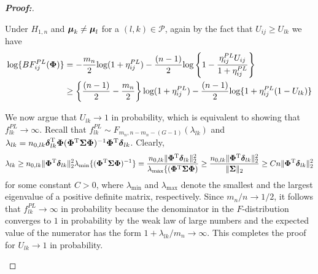 \documentclass[times,sort&compress,3p]{elsarticle}
\theoremstyle{plain}%
\theoremstyle{definition}
\def\log{\hbox{log}}
\def\log{\hbox{log}}
\def\be{\begin{eqnarray}}
\def\ee{\end{eqnarray}}
\def\trans{^{\rm T}}
\newcommand{\bSigma}{\mbox{\boldmath $\Sigma$}}
\newcommand{\udelta}            {\mbox{\boldmath$\delta$}}
\newcommand{\umu}               {\mbox{\boldmath$\mu$}}
\newcommand{\uPhi}              {\mbox{\boldmath$\Phi$}}
\begin{document}
\begin{proof}[\textbf{\upshape Proof:}]
\begin{description}
Under $H_{1,n}$ and $\umu_{k} \neq \umu_{l}$ for a $(l, k) \in \mathcal{P}$, again 
by the fact that $U_{ij}\geq U_{lk}$ 
we have
\begin{align*}
    \log\{BF^{PL}_{ij}(\uPhi) \} &= -\frac{m_n}{2}\log(1 + \eta^{PL}_{ij}) - \frac{(n-1)}{2}\log\left\{ 1 - \frac{\eta^{PL}_{ij} U_{ij}}{1 + \eta^{PL}_{ij}} \right\}\\
    & \geq \left\{\frac{(n - 1)}{2} - \frac{m_n}{2}\right\}\log(1 + \eta^{PL}_{ij}) - \frac{(n - 1)}{2}\log\{1 + \eta_{ij}^{PL}(1 - U_{lk})\}
\end{align*}
{\color{black}
We now argue that $U_{lk}\to 1$ in probability, which is equivalent to showing that $f_{lk}^{PL}\to\infty$. Recall that $f_{lk}^{PL}\sim F_{m_n, n - m_n - (G - 1)}(\lambda_{lk})$ and $\lambda_{lk} = n_{0,lk}\udelta_{lk}\trans\mathbf{\Phi}(\mathbf{\Phi}\trans\bSigma\mathbf{\Phi})^{-1}\mathbf{\Phi}\trans\udelta_{lk}$. Clearly,
\[
\lambda_{lk} \geq n_{0,lk}\|\mathbf{\Phi}\trans\udelta_{lk}\|_2^2\lambda_{\min}\{(\mathbf{\Phi}\trans\bSigma\mathbf{\Phi})^{-1}\}
= \frac{n_{0,lk}\|\mathbf{\Phi}\trans\udelta_{lk}\|_2^2}{\lambda_{\max}\{(\mathbf{\Phi}\trans\bSigma\mathbf{\Phi})}\geq \frac{n_{0,lk}\|\mathbf{\Phi}\trans\udelta_{lk}\|_2^2}{\|\bSigma\|_2} \geq Cn\|\mathbf{\Phi}\trans\udelta_{lk}\|_2^2 
\]
for some constant $C > 0$, where $\lambda_{\min}$ and $\lambda_{\max}$ denote the smallest and the largest eigenvalue of a positive definite matrix, respectively. 
Since $m_n/n\to 1/2$, it follows that $f_{lk}^{PL}\to \infty$ in probability because the denominator in the $F$-distribution converges to $1$ in probability by the weak law of large numbers and the expected value of the numerator has the form $1 + \lambda_{lk}/m_n\to\infty$. This completes the proof for $U_{lk}\to 1$ in probability. 

}
\end{description}
\end{proof}
\end{document}
